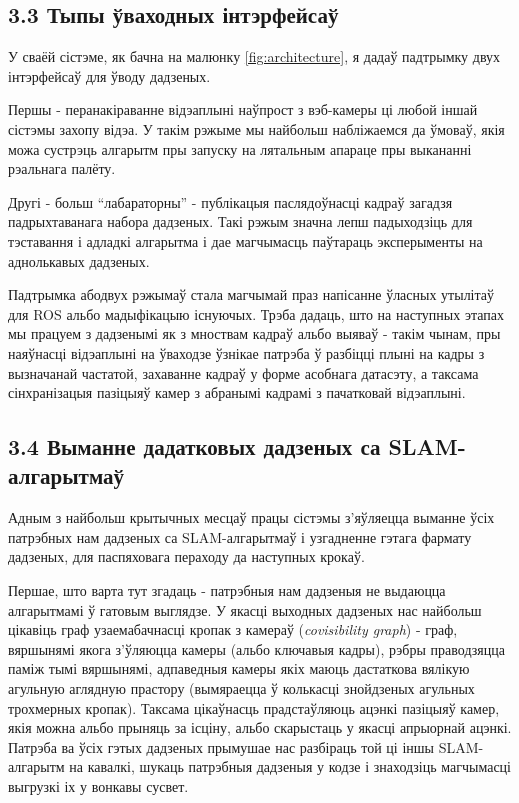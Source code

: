 \subsection*{3.3 Тыпы ўваходных інтэрфейсаў}

У сваёй сістэме, як бачна на малюнку \ref{fig:architecture}, я дадаў падтрымку двух інтэрфейсаў для ўводу дадзеных.

Першы - перанакіраванне відэаплыні наўпрост з вэб-камеры ці любой іншай сістэмы захопу відэа.
У такім рэжыме мы найбольш набліжаемся да ўмоваў, якія можа сустрэць алгарытм пры запуску на
лятальным апараце пры выкананні рэальнага палёту.

Другі - больш ``лабараторны'' - публікацыя паслядоўнасці кадраў загадзя падрыхтаванага
набора дадзеных. Такі рэжым значна лепш падыходзіць для тэставання і адладкі алгарытма
і дае магчымасць паўтараць эксперыменты на аднолькавых дадзеных.

Падтрымка абодвух рэжымаў стала магчымай праз напісанне ўласных утылітаў для ROS
альбо мадыфікацыю існуючых. Трэба дадаць, што на наступных этапах мы працуем
з дадзенымі як з мноствам кадраў альбо выяваў - такім чынам, пры наяўнасці відэаплыні
на ўваходзе ўзнікае патрэба ў разбіцці плыні на кадры з вызначанай частатой, захаванне кадраў
у форме асобнага датасэту, а таксама сінхранізацыя пазіцыяў камер з абранымі кадрамі з пачатковай
відэаплыні.

\subsection*{3.4 Выманне дадатковых дадзеных са SLAM-алгарытмаў}

Адным з найбольш крытычных месцаў працы сістэмы з'яўляецца выманне ўсіх патрэбных нам дадзеных
са SLAM-алгарытмаў і узгадненне гэтага фармату дадзеных, для паспяховага пераходу да
наступных крокаў.

Першае, што варта тут згадаць - патрэбныя нам дадзеныя не выдаюцца алгарытмамі ў гатовым выглядзе.
У якасці выходных дадзеных нас найбольш цікавіць граф узаемабачнасці кропак з камераў
(\textit{covisibility graph}) - граф, вяршынямі якога з'ўляюцца камеры (альбо ключавыя кадры), рэбры
праводзяцца паміж тымі вяршынямі, адпаведныя камеры якіх маюць дастаткова вялікую агульную
аглядную прастору (вымяраецца ў колькасці знойдзеных агульных трохмерных кропак). Таксама
цікаўнасць прадстаўляюць ацэнкі пазіцыяў камер, якія можна альбо прыняць за ісціну, альбо
скарыстаць у якасці апрыорнай ацэнкі. Патрэба ва ўсіх гэтых дадзеных прымушае нас
разбіраць той ці іншы SLAM-алгарытм на кавалкі, шукаць патрэбныя дадзеныя у кодзе і знаходзіць магчымасці
выгрузкі іх у вонкавы сусвет.

